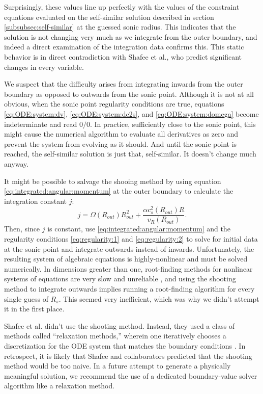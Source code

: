 \documentclass[]{article}
\begin{document}
Surprisingly, these values line up perfectly with the values of the
constraint equations evaluated on the self-similar solution described
in section \ref{subsubsec:self-similar} at the guessed sonic
radius. This indicates that the solution is not changing very much as
we integrate from the outer boundary, and indeed a direct examination
of the integration data confirms this. This static behavior is in
direct contradiction with Shafee et al., who predict significant
changes in every variable.

We suspect that the difficulty arises from integrating inwards from
the outer boundary as opposed to outwards from the sonic
point. Although it is not at all obvious, when the sonic point
regularity conditions are true, equations \eqref{eq:ODE:system:dv},
\eqref{eq:ODE:system:dc2s}, and \eqref{eq:ODE:system:domega} become
indeterminate and read $0/0$. In practice, sufficiently close to the
sonic point, this might cause the numerical algorithm to evaluate all
derivatives as zero and prevent the system from evolving as it
should. And until the sonic point is reached, the self-similar
solution is just that, self-similar. It doesn't change much anyway.

It might be possible to salvage the shooing method by using equation
\eqref{eq:integrated:angular:momentum} at the outer boundary to
calculate the integration constant $j$:
\begin{equation}
  \label{eq:j:solution}
  j = \Omega(R_{out}) R_{out}^2 + \frac{\alpha c_s^2(R_{out}) R}{v_R(R_{out})}.
\end{equation}
Then, since $j$ is constant, use
\eqref{eq:integrated:angular:momentum} and the regularity conditions
\eqref{eq:regularity:1} and \eqref{eq:regularity:2} to solve for
initial data at the sonic point and integrate outwards instead of
inwards. Unfortunately, the resulting system of algebraic equations is
highly-nonlinear and must be solved numerically. In dimensions greater
than one, root-finding methods for nonlinear systems of equations are
very slow and unreliable \cite{NumericalRecipes,Heath}, and using the
shooting method to integrate outwards implies running a root-finding
algorithm for every single guess of $R_s$. This seemed very
inefficient, which was why we didn't attempt it in the first place.

Shafee et al. didn't use the shooting method. Instead, they used a
class of methods called ``relaxation methods,'' \cite{Shafee08}
wherein one iteratively chooses a discretization for the ODE system
that matches the boundary conditions \cite{NumericalRecipes}. In
retrospect, it is likely that Shafee and collaborators predicted that
the shooting method would be too naive. In a future attempt to
generate a physically meaningful solution, we recommend the use of a
dedicated boundary-value solver algorithm like a relaxation method.
\end{document}
